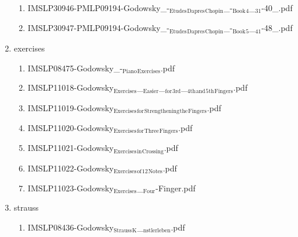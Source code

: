 \documentclass[11pt]{article}
\begin{document}
\begin{enumerate}
\begin{enumerate}
\item IMSLP30946-PMLP09194-Godowsky\_-$_{\text{Etudes}}$$_{\text{Dapres}}$$_{\text{Chopin}}$\_-$_{\text{Book}}$$_{\text{4}}$\_$_{\text{31}}$-40\_.pdf
\label{sec-1-1-1-1-44-34-21-6}

\item IMSLP30947-PMLP09194-Godowsky\_-$_{\text{Etudes}}$$_{\text{Dapres}}$$_{\text{Chopin}}$\_-$_{\text{Book}}$$_{\text{5}}$\_$_{\text{41}}$-48\_.pdf
\label{sec-1-1-1-1-44-34-21-7}
\end{enumerate}

\item exercises
\label{sec-1-1-1-1-44-34-22}
\begin{enumerate}
\item IMSLP08475-Godowsky\_-$_{\text{Piano}}$$_{\text{Exercises}}$.pdf
\label{sec-1-1-1-1-44-34-22-1}

\item IMSLP11018-Godowsky$_{\text{Exercises}}$\_$_{\text{Easier}}$\_$_{\text{for}}$$_{\text{3rd}}$\_$_{\text{4th}}$$_{\text{and}}$$_{\text{5th}}$$_{\text{Fingers}}$.pdf
\label{sec-1-1-1-1-44-34-22-2}

\item IMSLP11019-Godowsky$_{\text{Exercises}}$$_{\text{for}}$$_{\text{Strengthening}}$$_{\text{the}}$$_{\text{Fingers}}$.pdf
\label{sec-1-1-1-1-44-34-22-3}

\item IMSLP11020-Godowsky$_{\text{Exercises}}$$_{\text{for}}$$_{\text{Three}}$$_{\text{Fingers}}$.pdf
\label{sec-1-1-1-1-44-34-22-4}

\item IMSLP11021-Godowsky$_{\text{Exercises}}$$_{\text{in}}$$_{\text{Crossing}}$.pdf
\label{sec-1-1-1-1-44-34-22-5}

\item IMSLP11022-Godowsky$_{\text{Exercises}}$$_{\text{of}}$$_{\text{12}}$$_{\text{Notes}}$.pdf
\label{sec-1-1-1-1-44-34-22-6}

\item IMSLP11023-Godowsky$_{\text{Exercises}}$\_$_{\text{Four}}$-Finger.pdf
\label{sec-1-1-1-1-44-34-22-7}
\end{enumerate}

\item strauss
\label{sec-1-1-1-1-44-34-23}
\begin{enumerate}
\item IMSLP08436-Godowsky$_{\text{Strauss}}$$_{\text{K}}$\_$_{\text{nstlerleben}}$.pdf
\label{sec-1-1-1-1-44-34-23-1}


\end{enumerate}
\end{enumerate}
\end{document}
